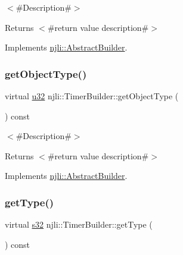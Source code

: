 $<$\#\+Description\#$>$

\begin{DoxyReturn}{Returns}
$<$\#return value description\#$>$ 
\end{DoxyReturn}


Implements \mbox{\hyperlink{classnjli_1_1_abstract_builder_a902f73ea78031b06aca183a417f3413b}{njli\+::\+Abstract\+Builder}}.

\mbox{\label{classnjli_1_1_timer_builder_aa55f6d594d7c37f66b1c0e6d9d75a298}} 
\subsubsection{\texorpdfstring{get\+Object\+Type()}{getObjectType()}}
{\footnotesize\ttfamily virtual \mbox{\hyperlink{_util_8h_a10e94b422ef0c20dcdec20d31a1f5049}{u32}} njli\+::\+Timer\+Builder\+::get\+Object\+Type (\begin{DoxyParamCaption}{ }\end{DoxyParamCaption}) const\hspace{0.3cm}{\ttfamily [virtual]}}

$<$\#\+Description\#$>$

\begin{DoxyReturn}{Returns}
$<$\#return value description\#$>$ 
\end{DoxyReturn}


Implements \mbox{\hyperlink{classnjli_1_1_abstract_builder_a0f2d344fcf697b167f4f2b1122b5fb33}{njli\+::\+Abstract\+Builder}}.

\mbox{\label{classnjli_1_1_timer_builder_a94721644d15adc821fae771bcd968063}} 
\subsubsection{\texorpdfstring{get\+Type()}{getType()}}
{\footnotesize\ttfamily virtual \mbox{\hyperlink{_util_8h_aa62c75d314a0d1f37f79c4b73b2292e2}{s32}} njli\+::\+Timer\+Builder\+::get\+Type (\begin{DoxyParamCaption}{ }\end{DoxyParamCaption}) const\hspace{0.3cm}{\ttfamily [virtual]}}

